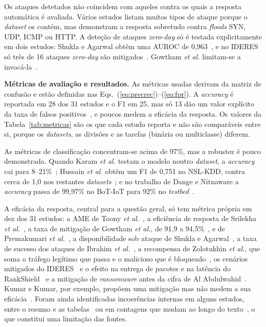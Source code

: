 \documentclass[conference,a4paper]{IEEEtran}
\begin{document}
Os ataques detetados não coincidem com aqueles contra os quais a resposta automática é
avaliada. Vários estudos listam muitos tipos de ataque porque o \textit{dataset} os
contém, mas demonstram a resposta sobretudo contra \textit{floods} SYN, UDP, ICMP ou HTTP.
A deteção de ataques \textit{zero-day} só é testada explicitamente em dois estudos:
Shukla e Agarwal obtêm uma AUROC de 0,963~\cite{shukla2026cyber}, e no IDERES só três de
16 ataques \textit{zero-day} são mitigados~\cite{rose2022ideres}. Gowtham
\textit{et al.} limitam-se a invocá-la~\cite{gowtham2026fedmp}.


\textbf{Métricas de avaliação e resultados.} As métricas usadas derivam da matriz de
confusão e estão definidas nas Eqs.~(\ref{eq:precrec})--(\ref{eq:fpr}). A
\textit{accuracy} é reportada em 28 dos 31 estudos e o F1 em 25, mas só 13 dão um valor
explícito da taxa de falsos
positivos~\cite{srilekha2025hybrid,shukla2026cyber,kumar2025advanced,gowtham2026fedmp,toony2024multiblock,verma2024petrak,rose2022ideres,elsayed2024mpguard,Abdulwahid2025,Iqbal2026,Rasheed2026,Arulkumar2026,Chaudhary2025},
e poucos medem a eficácia da resposta. Os valores da Tabela~\ref{tab:metricas} são os que
cada estudo reporta e não são comparáveis entre si, porque os \textit{datasets}, as
divisões e as tarefas (binária ou multiclasse) diferem.


As métricas de classificação concentram-se acima de 97\%, mas a robustez é pouco
demonstrada. Quando Karam \textit{et al.} testam o modelo noutro \textit{dataset}, a
\textit{accuracy} cai para 8--21\%~\cite{karam2025isaaf}; Hussain \textit{et al.} obtêm um
F1 de 0,751 no NSL-KDD, contra cerca de 1,0 nos restantes
\textit{datasets}~\cite{hussain2026postquantum}; e no trabalho de Dange e Nitnaware a
\textit{accuracy} passa de 99,97\% no BoT-IoT para 92\% no
\textit{testbed}~\cite{dange2025dual}.

A eficácia da resposta, central para a questão geral, só tem métrica própria em dez
dos 31 estudos: a AME de Toony \textit{et al.}~\cite{toony2024multiblock}, a eficiência de
resposta de Srilekha \textit{et al.}~\cite{srilekha2025hybrid}, a taxa de mitigação de
Gowtham \textit{et al.}, de 91,9 a 94,5\%~\cite{gowtham2026fedmp}, e de Premakumari
\textit{et al.}~\cite{premakumari2025qlearning}, a disponibilidade sob ataque de Shukla e
Agarwal~\cite{shukla2026cyber}, a taxa de sucesso dos ataques de Ibrahim
\textit{et al.}~\cite{ibrahim2026purechain}, a recompensa de Zolotukhin \textit{et al.},
que soma o tráfego legítimo que passa e o malicioso que é
bloqueado~\cite{zolotukhin2021curious}, os cenários mitigados do
IDERES~\cite{rose2022ideres} e o efeito na entrega de pacotes e na latência do
RankShield~\cite{hunde2026rankshield} e a mitigação de \textit{ransomware} antes da cifra
de Al Abdulwahid~\cite{Abdulwahid2025}. Kumar e Kumar, por exemplo, propõem uma mitigação mas não
medem a sua eficácia~\cite{kumar2025advanced}. Foram ainda identificadas incoerências
internas em alguns estudos, entre o resumo e as
tabelas~\cite{hussain2026postquantum,premakumari2025qlearning,kumar2025advanced} ou em
contagens que mudam ao longo do texto~\cite{mazhar2022ridps}, o que constitui uma
limitação das fontes.
\end{document}
